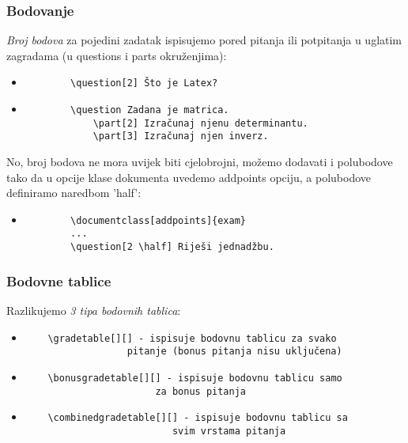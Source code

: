 \documentclass{beamer}
\begin{document}
	\begin{frame}[fragile]
\frametitle{Bodovanje}
\emph{Broj bodova} za pojedini zadatak ispisujemo pored pitanja ili potpitanja u uglatim zagradama (u questions i parts okruženjima):
\begin{itemize}
	\item
		\begin{verbatim}
		\question[2] Što je Latex?
		\end{verbatim}
	\item
		\begin{verbatim}
		\question Zadana je matrica.
			\part[2] Izračunaj njenu determinantu.
			\part[3] Izračunaj njen inverz.
		\end{verbatim}
\end{itemize}
No, broj bodova ne mora uvijek biti cjelobrojni, možemo dodavati i polubodove tako da u opcije klase dokumenta uvedemo addpoints opciju, a polubodove definiramo naredbom 'half':
\begin{itemize}
	\item 
		\begin{verbatim}
		\documentclass[addpoints]{exam}
		...
		\question[2 \half] Riješi jednadžbu.
		\end{verbatim}
\end{itemize}
\end{frame}

\begin{frame}[fragile]
\frametitle{Bodovne tablice}
Razlikujemo \emph{3 tipa bodovnih tablica}:
\begin{itemize}
\item 
    \begin{verbatim}
	\gradetable[][] - ispisuje bodovnu tablicu za svako 
				  pitanje (bonus pitanja nisu uključena)
    \end{verbatim} 
\item 
    \begin{verbatim}
	\bonusgradetable[][] - ispisuje bodovnu tablicu samo 
					   za bonus pitanja
    \end{verbatim}
\item 
    \begin{verbatim}
	\combinedgradetable[][] - ispisuje bodovnu tablicu sa 
						  svim vrstama pitanja
    \end{verbatim}
\end{itemize}
\end{frame}	
\end{document}
